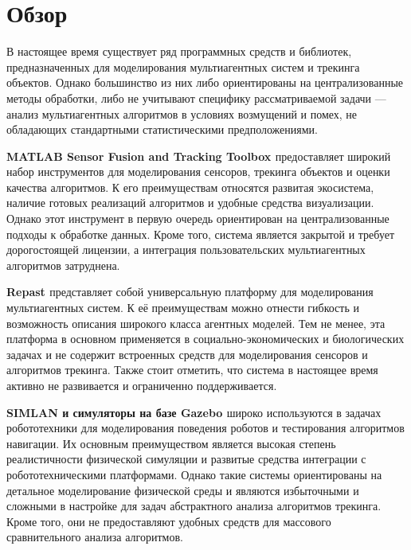 
\section{Обзор}
\label{sec:relatedworks}

В настоящее время существует ряд программных средств и библиотек,
предназначенных для моделирования мультиагентных систем и трекинга объектов. Однако большинство из них либо
ориентированы на централизованные методы обработки, либо не учитывают
специфику рассматриваемой задачи — анализ мультиагентных алгоритмов
в условиях возмущений и помех, не обладающих стандартными статистическими
предположениями.

\textbf{MATLAB Sensor Fusion and Tracking Toolbox \cite{MATLAB_toolbox}} предоставляет широкий
набор инструментов для моделирования сенсоров, трекинга объектов и оценки
качества алгоритмов. К его преимуществам относятся развитая экосистема,
наличие готовых реализаций алгоритмов и удобные средства визуализации.
Однако этот инструмент в первую очередь ориентирован на централизованные
подходы к обработке данных. Кроме того, система является закрытой и требует
дорогостоящей лицензии, а интеграция пользовательских мультиагентных
алгоритмов затруднена.

\textbf{Repast \cite{Repast}} представляет собой универсальную
платформу для моделирования мультиагентных систем. К её преимуществам можно
отнести гибкость и возможность описания широкого класса агентных моделей.
Тем не менее, эта платформа в основном применяется в социально-экономических
и биологических задачах и не содержит встроенных средств для моделирования
сенсоров и алгоритмов трекинга. Также стоит отметить, что система в настоящее
время активно не развивается и ограниченно поддерживается.

\textbf{SIMLAN и симуляторы на базе Gazebo \cite{SIMLAN}} широко используются в задачах
робототехники для моделирования поведения роботов и тестирования алгоритмов
навигации. Их основным преимуществом является высокая степень реалистичности
физической симуляции и развитые средства интеграции с робототехническими
платформами. Однако такие системы ориентированы на детальное моделирование
физической среды и являются избыточными и сложными в настройке для задач
абстрактного анализа алгоритмов трекинга. Кроме того, они не предоставляют
удобных средств для массового сравнительного анализа алгоритмов.

\vspace{0.5em}

